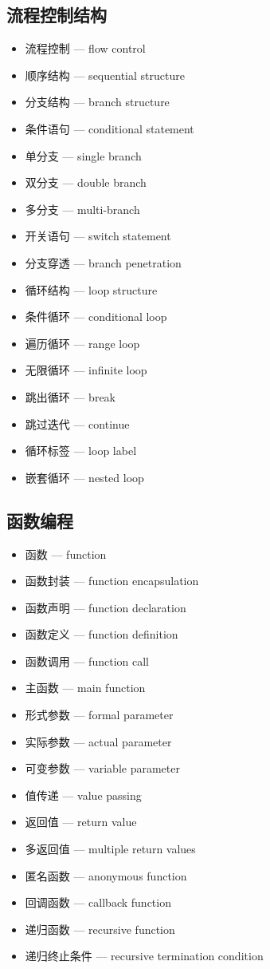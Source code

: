 \subsection{流程控制结构}
\begin{itemize}
\item 流程控制 — flow control
\item 顺序结构 — sequential structure
\item 分支结构 — branch structure
\item 条件语句 — conditional statement
\item 单分支 — single branch
\item 双分支 — double branch
\item 多分支 — multi-branch
\item 开关语句 — switch statement
\item 分支穿透 — branch penetration
\item 循环结构 — loop structure
\item 条件循环 — conditional loop
\item 遍历循环 — range loop
\item 无限循环 — infinite loop
\item 跳出循环 — break
\item 跳过迭代 — continue
\item 循环标签 — loop label
\item 嵌套循环 — nested loop
\end{itemize}

\subsection{函数编程}
\begin{itemize}
\item 函数 — function
\item 函数封装 — function encapsulation
\item 函数声明 — function declaration
\item 函数定义 — function definition
\item 函数调用 — function call
\item 主函数 — main function
\item 形式参数 — formal parameter
\item 实际参数 — actual parameter
\item 可变参数 — variable parameter
\item 值传递 — value passing
\item 返回值 — return value
\item 多返回值 — multiple return values
\item 匿名函数 — anonymous function
\item 回调函数 — callback function
\item 递归函数 — recursive function
\item 递归终止条件 — recursive termination condition
\end{itemize}

